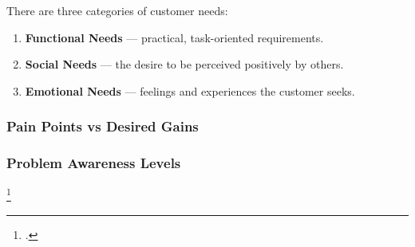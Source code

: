 There are three categories of customer needs:

\begin{enumerate}
    \item \textbf{Functional Needs} --- practical, task-oriented requirements.
    \item \textbf{Social Needs} --- the desire to be perceived positively by others.
    \item \textbf{Emotional Needs} --- feelings and experiences the customer seeks.
\end{enumerate}

\subsubsection{Pain Points vs Desired Gains}\mbox{}
\subsubsection{Problem Awareness Levels}\mbox{}
\footcite{christensen2016know}

